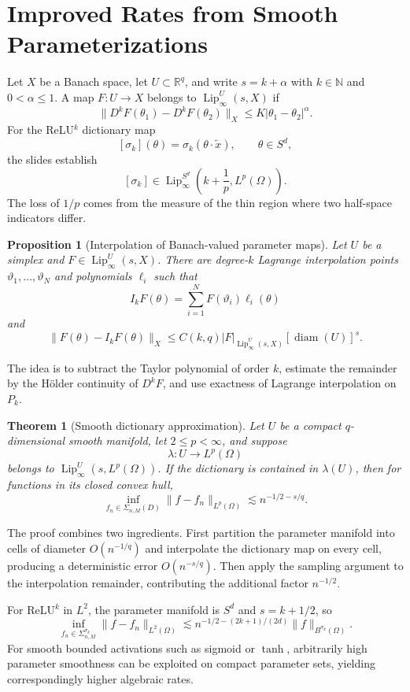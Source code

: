 \documentclass[11pt,a4paper]{article}
\newcommand{\R}{\mathbb{R}}
\newcommand{\N}{\mathbb{N}}
\theoremstyle{definition}
\theoremstyle{plain}
\newtheorem{theorem}{Theorem}[section]
\theoremstyle{remark}
\theoremstyle{plain}
\newtheorem{proposition}{Proposition}[section]
\begin{document}
\section{Improved Rates from Smooth Parameterizations}

Let $X$ be a Banach space, let $U\subset\R^q$, and write $s=k+\alpha$ with $k\in\N$ and $0<\alpha\le1$. A map $F:U\to X$ belongs to $\operatorname{Lip}_\infty^U(s,X)$ if
\[
  \|D^kF(\theta_1)-D^kF(\theta_2)\|_X
  \le K|\theta_1-\theta_2|^\alpha.
\]
For the ReLU$^k$ dictionary map
\[
  [\sigma_k](\theta)=\sigma_k(\theta\cdot\widetilde x),
  \qquad \theta\in S^d,
\]
the slides establish
\[
  [\sigma_k]\in
  \operatorname{Lip}_\infty^{S^d}
  \left(k+\frac1p,L^p(\Omega)\right).
\]
The loss of $1/p$ comes from the measure of the thin region where two half-space indicators differ.

\begin{proposition}[Interpolation of Banach-valued parameter maps]
Let $U$ be a simplex and $F\in\operatorname{Lip}_\infty^U(s,X)$. There are degree-$k$ Lagrange interpolation points $\vartheta_1,\ldots,\vartheta_N$ and polynomials $\ell_i$ such that
\[
  I_kF(\theta)=\sum_{i=1}^NF(\vartheta_i)\ell_i(\theta)
\]
and
\[
  \|F(\theta)-I_kF(\theta)\|_X
  \le C(k,q)|F|_{\operatorname{Lip}_\infty^U(s,X)}
  [\operatorname{diam}(U)]^s.
\]
\end{proposition}

The idea is to subtract the Taylor polynomial of order $k$, estimate the remainder by the H\"older continuity of $D^kF$, and use exactness of Lagrange interpolation on $P_k$.

\begin{theorem}[Smooth dictionary approximation]
Let $U$ be a compact $q$-dimensional smooth manifold, let $2\le p<\infty$, and suppose
\[
  \lambda:U\to L^p(\Omega)
\]
belongs to $\operatorname{Lip}_\infty^U(s,L^p(\Omega))$. If the dictionary is contained in $\lambda(U)$, then for functions in its closed convex hull,
\[
  \inf_{f_n\in\Sigma_{n,M}(D)}
  \|f-f_n\|_{L^p(\Omega)}
  \lesssim n^{-1/2-s/q}.
\]
\end{theorem}

The proof combines two ingredients. First partition the parameter manifold into cells of diameter $O(n^{-1/q})$ and interpolate the dictionary map on every cell, producing a deterministic error $O(n^{-s/q})$. Then apply the sampling argument to the interpolation remainder, contributing the additional factor $n^{-1/2}$.

For ReLU$^k$ in $L^2$, the parameter manifold is $S^d$ and $s=k+1/2$, so
\[
  \inf_{f_n\in\Sigma_{n,M}^{\sigma_k}}
  \|f-f_n\|_{L^2(\Omega)}
  \lesssim
  n^{-1/2-(2k+1)/(2d)}
  \|f\|_{B^{\sigma_k}(\Omega)}.
\]
For smooth bounded activations such as sigmoid or $\tanh$, arbitrarily high parameter smoothness can be exploited on compact parameter sets, yielding correspondingly higher algebraic rates.
\end{document}
